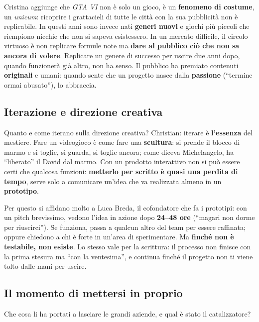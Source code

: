 Cristina aggiunge che \emph{GTA VI} non è solo un gioco, è un \textbf{fenomeno di
costume}, un \emph{unicum}: ricoprire i grattacieli di tutte le città con la sua
pubblicità non è replicabile. In questi anni sono invece nati \textbf{generi nuovi} e
giochi più piccoli che riempiono nicchie che non si sapeva esistessero. In un mercato
difficile, il circolo virtuoso è non replicare formule note ma \textbf{dare al
pubblico ciò che non sa ancora di volere}. Replicare un genere di successo per
uscire due anni dopo, quando funzionerà già altro, non ha senso. Il pubblico ha
premiato contenuti \textbf{originali} e umani: quando sente che un progetto nasce
dalla \textbf{passione} (``termine ormai abusato''), lo abbraccia.

\subsection{Iterazione e direzione creativa}

Quanto e come iterano sulla direzione creativa? Christian: iterare è
\textbf{l'essenza} del mestiere. Fare un videogioco è come fare una
\textbf{scultura}: si prende il blocco di marmo e si toglie, si guarda, si toglie
ancora; come diceva Michelangelo, ha ``liberato'' il David dal marmo. Con un
prodotto interattivo non si può essere certi che qualcosa funzioni: \textbf{metterlo
per scritto è quasi una perdita di tempo}, serve solo a comunicare un'idea che va
realizzata almeno in un \textbf{prototipo}.

Per questo si affidano molto a Luca Breda, il cofondatore che fa i prototipi: con un
pitch brevissimo, vedono l'idea in azione dopo \textbf{24--48 ore} (``magari non
dorme per riuscirci''). Se funziona, passa a qualcun altro del team per essere
raffinata; oppure chiedono a chi è forte in un'area di sperimentare. Ma
\textbf{finché non è testabile, non esiste}. Lo stesso vale per la scrittura: il
processo non finisce con la prima stesura ma ``con la ventesima'', e continua
finché il progetto non ti viene tolto dalle mani per uscire.

\subsection{Il momento di mettersi in proprio}

Che cosa li ha portati a lasciare le grandi aziende, e qual è stato il catalizzatore?

